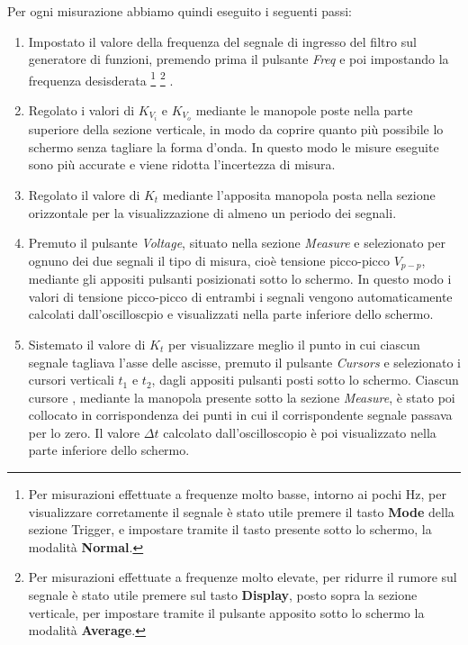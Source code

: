 Per ogni misurazione abbiamo quindi eseguito i seguenti passi:
\begin{enumerate}
    \item Impostato il valore della frequenza del segnale di ingresso del filtro  sul generatore di funzioni, premendo prima il pulsante \emph{Freq} e poi impostando la frequenza desisderata \footnote{Per misurazioni effettuate a frequenze molto basse, intorno ai pochi Hz, per visualizzare corretamente il segnale è stato utile premere il tasto \textbf{Mode} della sezione Trigger, e impostare tramite il tasto presente sotto lo schermo, la modalità \textbf{Normal}.} \footnote{Per misurazioni effettuate a frequenze molto elevate, per ridurre il rumore sul segnale è stato utile premere sul tasto \textbf{Display}, posto sopra la sezione verticale, per impostare tramite il pulsante apposito sotto lo schermo la modalità \textbf{Average}.} .
    \item Regolato i valori di $K_{V_i}$ e $K_{V_o}$ mediante le manopole poste nella parte superiore della sezione verticale, in modo da coprire quanto più possibile lo schermo senza tagliare la forma d'onda. In questo modo le misure eseguite sono più accurate e viene ridotta l'incertezza di misura.
    \item Regolato il valore di $K_t$ mediante l'apposita manopola posta nella sezione orizzontale per la visualizzazione di almeno un periodo dei segnali.
    \item Premuto il pulsante \emph{Voltage}, situato nella sezione \emph{Measure} e selezionato per ognuno dei due segnali il tipo di misura, cioè tensione picco-picco $V_{p-p}$, mediante gli appositi pulsanti posizionati sotto lo schermo.
    In questo modo i valori di tensione picco-picco di entrambi i segnali vengono automaticamente calcolati dall'oscilloscpio e visualizzati nella parte inferiore dello schermo.
    \item Sistemato il valore di $K_t$ per visualizzare meglio il punto in cui ciascun segnale tagliava l'asse delle ascisse, premuto il pulsante \emph{Cursors} e selezionato i cursori verticali $t_1$ e $t_2$, dagli appositi pulsanti posti sotto lo schermo. Ciascun cursore , mediante la manopola presente sotto la sezione \emph{Measure}, è stato poi collocato in corrispondenza dei punti in cui il corrispondente segnale passava per lo zero. Il valore $\Delta t$  calcolato dall'oscilloscopio è poi visualizzato nella parte inferiore dello schermo. 
    
\end{enumerate}




